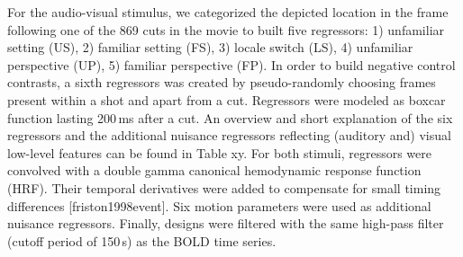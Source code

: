 \documentclass[english]{article}
\begin{document}
For the audio-visual stimulus, we categorized the depicted location in the frame following one of the 869 cuts in the movie to built five regressors: 1) unfamiliar setting (US), 2) familiar setting (FS), 3) locale switch (LS), 4) unfamiliar perspective (UP), 5) familiar perspective (FP). In order to build negative control contrasts, a sixth regressors was created by pseudo-randomly choosing frames present within a shot and apart from a cut. Regressors were modeled as boxcar function lasting 200\,ms after a cut. An overview and short explanation of the six regressors and the additional nuisance regressors reflecting (auditory and) visual low-level features can be found in Table xy.
For both stimuli, regressors were convolved with a double gamma canonical hemodynamic response function (HRF). Their temporal derivatives were added to compensate for small timing differences [friston1998event]. Six motion parameters were used as additional nuisance regressors. Finally, designs were filtered with the same high-pass filter (cutoff period of 150\,s) as the BOLD time series.
\end{document}
